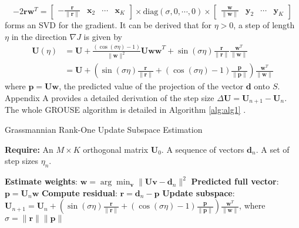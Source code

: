 \begin{equation}
\label{eq:svd}
-2\mathbf{rw}^T = \left[\begin{array}{cccc}
-\frac{\mathbf{r}}{\parallel \mathbf{r} \parallel} & \mathbf{x}_2 & \cdots & \mathbf{x}_K 
\end{array} \right] \times \text{diag}(\sigma,0,\cdots,0)\times
\left[\begin{array}{cccc}
\frac{\mathbf{w}}{\parallel \mathbf{w} \parallel} & \mathbf{y}_2 & \cdots & \mathbf{y}_K 
\end{array} \right]
\end{equation}
forms an SVD for the gradient. It can be derived that for $\eta>0$, a step of length $\eta$ in the direction $\nabla J$ is given by
\begin{equation}
\label{eq:upsize}
\begin{split}
\mathbf{U}(\eta) & =\mathbf{U}+\frac{(\cos(\sigma\eta)-1)}{\parallel \mathbf{w} \parallel^2} \mathbf{Uww}^T+\sin(\sigma\eta) \frac{\mathbf{r}}{\parallel \mathbf{r} \parallel} \frac{\mathbf{w}^T}{\parallel \mathbf{w} \parallel} \\
&=\mathbf{U}+\left( \sin(\sigma\eta)\frac{\mathbf{r}}{\parallel \mathbf{r} \parallel} + (\cos(\sigma\eta)-1)\frac{\mathbf{p}}{\parallel \mathbf{p} \parallel} \right) \frac{\mathbf{w}^T}{\parallel \mathbf{w} \parallel}
\end{split}
\end{equation}
where $\mathbf{p}=\mathbf{Uw}$, the predicted value of the projection of the vector $\mathbf{d}$ onto $S$. Appendix A provides a detailed derivation of the step size $\Delta \mathbf{U}=\mathbf{U}_{n+1}-\mathbf{U}_{n}$. The whole GROUSE algorithm is detailed in Algorithm \ref{alg:alg1} \cite[]{laura2010}.

  \begin{algorithm}
   \caption{Grassmannian Rank-One Update Subspace Estimation}
   \textbf{Require:} An $M\times K$ orthogonal matrix $\mathbf{U}_0$. A sequence of vectors $\mathbf{d}_n$. A set of step sizes $\eta_n$. 
    \begin{algorithmic}[1]
     \State \textbf{Estimate weights}: $\mathbf{w}=\arg\min_{\mathbf{v}} \parallel \mathbf{Uv}-\mathbf{d}_n \parallel^2$
     \State \textbf{Predicted full vector}: $\mathbf{p}=\mathbf{U}_n \mathbf{w}$
     \State \textbf{Compute residual}: $\mathbf{r}=\mathbf{d}_n-\mathbf{p}$
     \State \textbf{Update subspace}: $\mathbf{U}_{n+1}=\mathbf{U}_n+\left( \sin(\sigma\eta)\frac{\mathbf{r}}{\parallel \mathbf{r} \parallel} + (\cos(\sigma\eta)-1)\frac{\mathbf{p}}{\parallel \mathbf{p} \parallel} \right) \frac{\mathbf{w}^T}{\parallel \mathbf{w} \parallel}$, where $\sigma=\parallel \mathbf{r} \parallel\parallel \mathbf{p} \parallel$
        \EndFor
\end{algorithmic}
\label{alg:alg1}
\end{algorithm}

